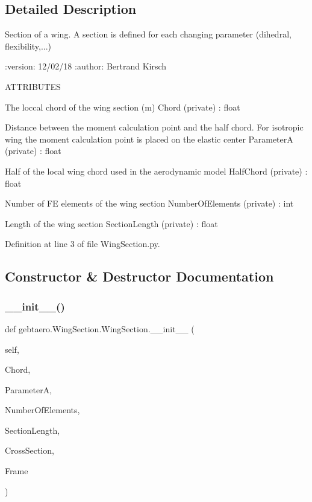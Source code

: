 \subsection{Detailed Description}
\begin{DoxyVerb}Section of a wing. A section is defined for each changing parameter (dihedral,
flexibility,...)

:version: 12/02/18
:author: Bertrand Kirsch

ATTRIBUTES

The loccal chord of the wing section (m)
Chord  (private) : float

Distance between the moment calculation point and the half chord. For isotropic
wing the moment calculation point is placed on the elastic center
ParameterA  (private) : float

Half of the local wing chord used in the aerodynamic model
HalfChord  (private) : float

Number of FE elements of the wing section
NumberOfElements  (private) : int

Length of the wing section
SectionLength (private) : float\end{DoxyVerb}
 

Definition at line 3 of file Wing\+Section.\+py.



\subsection{Constructor \& Destructor Documentation}
\mbox{\label{classgebtaero_1_1_wing_section_1_1_wing_section_aa313aa86c7d8588a0ce454b9268cf7a8}} 
\subsubsection{\texorpdfstring{\+\_\+\+\_\+init\+\_\+\+\_\+()}{\_\_init\_\_()}}
{\footnotesize\ttfamily def gebtaero.\+Wing\+Section.\+Wing\+Section.\+\_\+\+\_\+init\+\_\+\+\_\+ (\begin{DoxyParamCaption}\item[{}]{self,  }\item[{}]{Chord,  }\item[{}]{ParameterA,  }\item[{}]{Number\+Of\+Elements,  }\item[{}]{Section\+Length,  }\item[{}]{Cross\+Section,  }\item[{}]{Frame }\end{DoxyParamCaption})}



